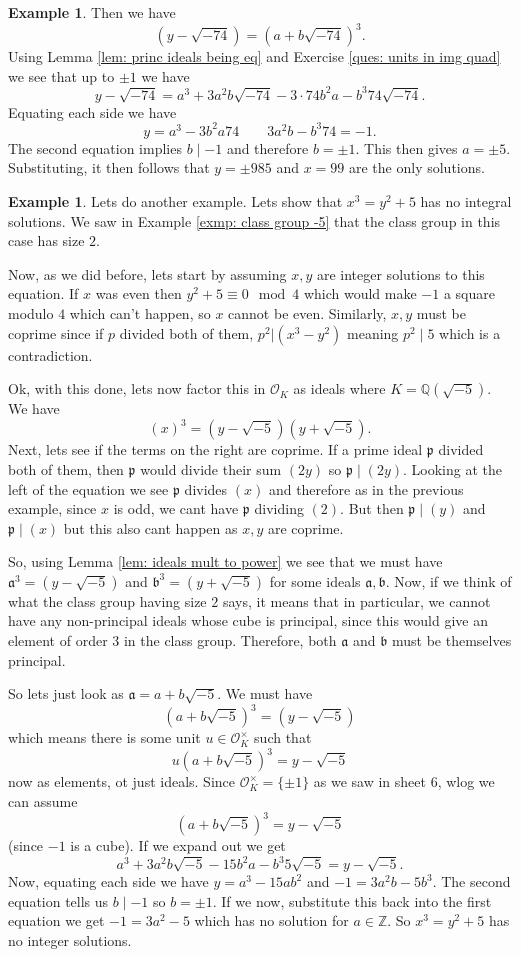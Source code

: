\documentclass[11pt,a4paper]{report}
\theoremstyle{plain}
\theoremstyle{definition}
\newtheorem{exmp}[subsection]{Example}
\theoremstyle{definition}
\newcommand{\ZZ}{\mathbb{Z}}
\def\QQ{\mathbb{Q}}
\def\gothb{\mathfrak{b}}
\def\gothp{\mathfrak{p}}
\def \OO {\mathcal{O}}
\def\gotha{\mathfrak{a}}
\begin{document}
\begin{exmp}
		Then we have \[(y-\sqrt{-74})=(a+b\sqrt{-74})^3.\] Using Lemma \ref{lem: princ ideals being eq} and Exercise \ref{ques: units in img quad} we see that up to $\pm 1$ we have \[y-\sqrt{-74}=a^3+3a^2b\sqrt{-74}-3\cdot 74b^2a-b^3 74 \sqrt{-74}.\] Equating each side we have \[y=a^3-3b^2a74 \qquad 3a^2b-b^3 74=-1.\] The second equation implies $b \mid -1$ and therefore $b=\pm 1$. This then gives $a=\pm 5$. Substituting,  it then follows that $y=\pm 985$ and $x=99$ are the only solutions.
		
	\end{exmp}
	
	
	
	\begin{exmp}
		Lets do another example. Lets show that $x^3=y^2+5$ has  no integral solutions. We saw in Example \ref{exmp: class group -5} that the class group in this case has size $2$.
		
		
		Now, as we did before, lets start by assuming $x,y$ are integer solutions to this equation. If $x$ was even then $y^2+5 \equiv 0 \mod 4$ which would make $-1$ a square modulo $4$ which can't happen, so $x$ cannot be even. Similarly, $x,y$ must be coprime since if $p$ divided both of them, $p^2| (x^3-y^2)$ meaning $p^2 \mid 5$ which is a contradiction.
		
		Ok, with this done, lets now factor this in $\OO_K$ as ideals where $K=\QQ(\sqrt{-5})$. We have \[(x)^3=(y-\sqrt{-5})(y+\sqrt{-5}).\] Next, lets see if the terms on the right are coprime. If a prime ideal $\gothp$ divided both of them, then $\gothp$ would divide their sum $(2y)$ so $\gothp \mid (2y)$. Looking at the left of the equation we see $\gothp$ divides $(x)$ and therefore as in the previous example, since $x$ is odd, we cant have $\gothp$ dividing $(2)$. But then $\gothp \mid (y)$ and $\gothp\mid (x)$ but this also cant happen as $x,y$ are coprime.
		
		So, using Lemma \ref{lem: ideals mult to power} we see that we must have $\gotha^3=(y-\sqrt{-5})$ and $\gothb^3=(y+\sqrt{-5})$ for some ideals $\gotha,\gothb$. Now, if we think of what the class group having size $2$ says, it means that in particular, we cannot have any non-principal ideals whose cube is principal, since this would give an element of order $3$ in the class group. Therefore, both $\gotha$ and $\gothb$ must be themselves principal.
		
		So lets just look as $\gotha=a+b\sqrt{-5}$. We must have \[(a+b\sqrt{-5})^3=(y-\sqrt{-5})\] which means there is some unit $u \in \OO_K^\times$ such that \[u(a+b\sqrt{-5})^3=y-\sqrt{-5}\] now as elements, ot just ideals. Since $\OO_K^\times=\{\pm 1\}$ as we saw in sheet 6, wlog we can assume \[(a+b\sqrt{-5})^3=y-\sqrt{-5}\] (since $-1$ is a cube). If we expand out we get \[a^3+3a^2b\sqrt{-5}-15b^2a-b^3 5 \sqrt{-5}=y-\sqrt{-5}.\] Now, equating each side we have $y=a^3-15ab^2$ and $-1=3a^2b-5b^3$. The second equation tells us $b \mid -1$ so $b=\pm 1$. If we now, substitute this back into the first equation we get $-1=3a^2-5$ which has no solution for $a \in \ZZ$. So $x^3=y^2+5$ has no integer solutions.
		

\end{exmp}
\end{document}
